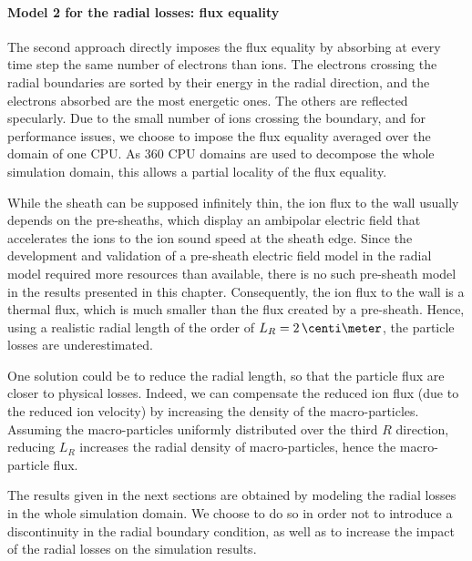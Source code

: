 \paragraph{Model 2 for the  radial losses\string: flux equality\\}
The second approach directly imposes the flux equality by absorbing at every time step the same number of electrons than ions.
The electrons crossing the radial boundaries are sorted by their energy in the radial direction, and the electrons absorbed are the most energetic ones.
The others are reflected specularly.
Due to the small number of ions crossing the boundary, and for performance issues, we choose to impose the flux equality averaged over the domain of one CPU.
As 360 CPU domains are used to decompose the whole simulation domain, this allows a partial locality of the flux equality. 

\vspace{1ex}
While the sheath can be supposed infinitely thin, the ion flux to the wall usually depends on the pre-sheaths, which display an ambipolar electric field that accelerates the ions to the ion sound speed at the sheath edge.
Since the development and validation of a pre-sheath electric field model in the radial model required more resources than available, there is no such pre-sheath model in the results presented in this chapter.
Consequently, the ion flux to the wall is a thermal flux, which is much smaller than the flux created by a pre-sheath.
Hence, using a realistic radial length  of the order of $L_R=2\,\centi\meter$, the particle losses are underestimated.

One solution could be to reduce the radial length, so that the particle flux are closer to physical losses.
Indeed, we can compensate the reduced ion flux (due to the reduced ion velocity) by increasing the density of the macro-particles.
Assuming the macro-particles uniformly distributed over the third $R$ direction, reducing  $L_R$ increases the radial density of macro-particles, hence the macro-particle flux.

The results given in the next sections are obtained by modeling the radial losses in the whole simulation domain.
We choose to do so in order not to introduce a discontinuity in the radial boundary condition, as well as to increase the impact of the radial losses on the simulation results.
